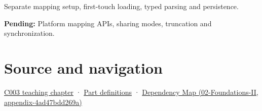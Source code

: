 Separate mapping setup, first-touch loading, typed parsing and persistence.

\textbf{Pending:} Platform mapping APIs, sharing modes, truncation and synchronization.

\section{Source and navigation}\label{appendix-313ee7a0ba7b-source-and-navigation}

\href{Continuous\%20Notes/Computing\%20Foundations\%20-\%20From\%20Bits\%20to\%20C++\%20and\%20Systems\%20APIs\#Where\%20the\%20bytes\%20live}{C003 teaching chapter} · \hyperref[appendix-fd090d982a15-m003---parts-41-60]{Part definitions} · \href{../02-Foundations-II/main.pdf\#nameddest=appendix-4ad47bdd269a}{Dependency Map (02-Foundations-II, appendix-4ad47bdd269a)}
